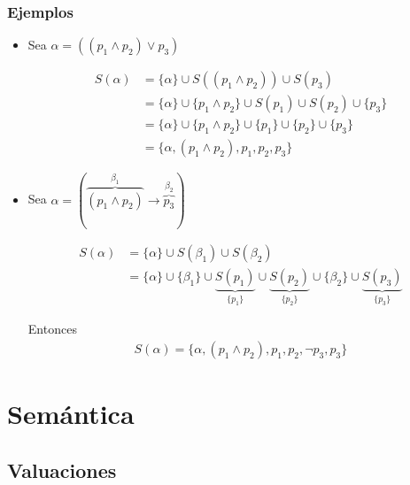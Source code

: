 \subsubsection{Ejemplos}

\begin{itemize}
    \item Sea $\alpha = ((p_1 \wedge p_2) \vee p_3)$

    \begin{align*}
        S(\alpha) &= \{\alpha\} \cup S((p_1 \wedge p_2)) \cup S(p_3) \\
                  &= \{\alpha\} \cup \{p_1 \wedge p_2\} \cup S(p_1) 
                  \cup S(p_2) \cup \{p_3\} \\
                  &= \{\alpha\} \cup \{p_1 \wedge p_2\} \cup \{p_1\} 
                  \cup \{p_2\} \cup \{p_3\} \\
                  &= \{ \alpha, (p_1 \wedge p_2), p_1, p_2, p_3 \}
    \end{align*}

    \item Sea $\alpha = (\overbrace{(p_1 \wedge p_2)}^{\beta_1} 
        \to \overbrace{p_3}^{\beta_2})$

        \begin{align*}
            S(\alpha) &= \{ \alpha \} \cup S(\beta_1) \cup S(\beta_2) \\
            &= \{ \alpha \} \cup \{ \beta_1 \} 
            \cup \underbrace{S(p_1)}_{\{ p_1 \}} 
            \cup \underbrace{S(p_2)}_{\{ p_2 \}} 
            \cup \{ \beta_2 \} \cup \underbrace{S(p_3)}_{\{ p_3 \}}
        \end{align*}

        Entonces
        \begin{gather*}
            S(\alpha) = \{\alpha, (p_1\wedge p_2), p_1, p_2,\neg p_3, p_3 \}
        \end{gather*}
\end{itemize}

\pagebreak
\section{Semántica}

\subsection{Valuaciones}


